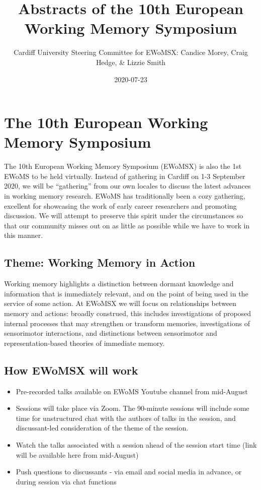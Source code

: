 \documentclass[
  12pt,
]{book}
\title{Abstracts of the 10th European Working Memory Symposium}
\author{Cardiff University Steering Committee for EWoMSX: Candice Morey, Craig Hedge, \& Lizzie Smith}
\date{2020-07-23}
\begin{document}
\maketitle

{
\setcounter{tocdepth}{1}
\tableofcontents
}
\hypertarget{the-10th-european-working-memory-symposium}{%
\chapter{The 10th European Working Memory Symposium}\label{the-10th-european-working-memory-symposium}}

The 10th European Working Memory Symposium (EWoMSX) is also the 1st EWoMS to be held virtually. Instead of gathering in Cardiff on 1-3 September 2020, we will be ``gathering'' from our own locales to discuss the latest advances in working memory research. EWoMS has traditionally been a cozy gathering, excellent for showcasing the work of early career researchers and promoting discussion. We will attempt to preserve this spirit under the circumstances so that our community misses out on as little as possible while we have to work in this manner.

\hypertarget{theme-working-memory-in-action}{%
\section{Theme: Working Memory in Action}\label{theme-working-memory-in-action}}

Working memory highlights a distinction between dormant knowledge and information that is immediately relevant, and on the point of being used in the service of some action. At EWoMSX we will focus on relationships between memory and actions: broadly construed, this includes investigations of proposed internal processes that may strengthen or transform memories, investigations of sensorimotor interactions, and distinctions between sensorimotor and representation-based theories of immediate memory.

\hypertarget{how-ewomsx-will-work}{%
\section{How EWoMSX will work}\label{how-ewomsx-will-work}}

\begin{itemize}
\item
  Pre-recorded talks available on EWoMS Youtube channel from mid-August
\item
  Sessions will take place via Zoom. The 90-minute sessions will include some time for unstructured chat with the authors of talks in the session, and discussant-led consideration of the theme of the session.
\item
  Watch the talks associated with a session ahead of the session start time (link will be available here from mid-August)
\item
  Push questions to discussants - via email and social media in advance, or during session via chat functions
\end{itemize}
\end{document}
